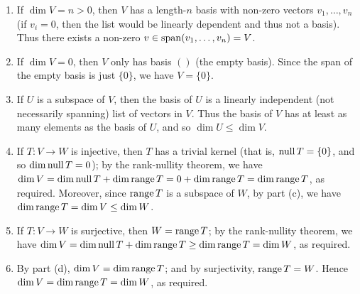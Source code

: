 \documentclass{review-sheet}
\begin{document}
\begin{solution}
  \begin{enumerate}[label=(\alph*)]
    \item If $\dim V = n > 0$, then $V$ has a length-$n$ basis with non-zero vectors $
      v_1,\ldots,v_n$ (if $v_i=0$, then the list would be linearly dependent and thus not a basis).
      Thus there exists a non-zero $v\in \operatorname{span}(v_1,\ldots,v_n)=V$.
    \item If $\dim V = 0$, then $V$ only has basis $()$ (the empty basis). Since the span of the
      empty basis is just $\{ 0 \}$, we have $V=\{ 0 \}$. 
    \item If $U$ is a subspace of $V$, then the basis of $U$ is a linearly independent (not
      necessarily spanning) list of vectors in $V$. Thus the basis of $V$ has at least as many
      elements as the basis of $U$, and so $\dim U \le \dim V$.
    \item If $T:V\to W$ is injective, then $T$ has a trivial kernel (that is, $\operatorname{null}{T}=\{ 0 \}$,
      and so $\dim\operatorname{null}{T}=0$); by the rank-nullity theorem, we have $\dim V = \dim\operatorname{null}{T} +
      \dim\operatorname{range}{T}=0+\dim{\operatorname{range}{T}}=\dim\operatorname{range}{T}$, as required. Moreover, since $ \operatorname{range} T$ is a
      subspace of $W$, by part (c), we have $\dim\operatorname{range}{T}=\dim{V}\le \dim{W}$.
    \item If $T:V\to W$ is surjective, then $W=\operatorname{range}{T}$; by the rank-nullity theorem, we have
        $\dim{V}=\dim\operatorname{null}{T}+\dim\operatorname{range}{T}\ge \dim\operatorname{range}{T}=\dim{W}$, as required.
      \item By part (d), $\dim V = \dim\operatorname{range} T$; and by surjectivity, $\operatorname{range} T = W$. Hence $\dim V
        = \dim \operatorname{range} T = \dim W$, as required.
  \end{enumerate}
\end{solution}
\end{document}

